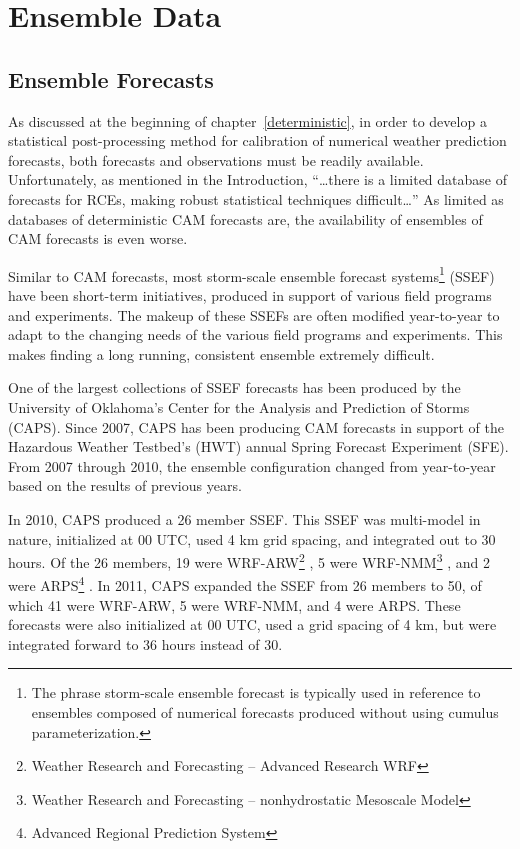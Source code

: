 

\section{Ensemble Data}
\label{edata}




\subsection{Ensemble Forecasts}
\label{emodel}

As discussed at the beginning of \mbox{chapter \ref{deterministic}}, in order to develop a statistical post-processing method for calibration of numerical weather prediction forecasts, both forecasts and observations must be readily available.
Unfortunately, as mentioned in the Introduction, ``\dots there is a limited database of forecasts for RCEs, making robust statistical techniques difficult\dots''
As limited as databases of deterministic CAM forecasts are, the availability of ensembles of CAM forecasts is even worse.


Similar to CAM forecasts, most storm-scale ensemble forecast systems\footnote{The phrase storm-scale ensemble forecast is typically used in reference to ensembles composed of numerical forecasts produced without using cumulus parameterization.} (SSEF) have been short-term initiatives, produced in support of various field programs and experiments.
The makeup of these SSEFs are often modified year-to-year to adapt to the changing needs of the various field programs and experiments.
This makes finding a long running, consistent ensemble extremely difficult.


One of the largest collections of SSEF forecasts has been produced by the University of Oklahoma's Center for the Analysis and Prediction of Storms (CAPS).
Since 2007, CAPS has been producing CAM forecasts in support of the Hazardous Weather Testbed's (HWT) annual Spring Forecast Experiment (SFE).
From 2007 through 2010, the ensemble configuration changed from year-to-year based on the results of previous years.


In 2010, CAPS produced a 26 member SSEF.
This SSEF was multi-model in nature, initialized at 00 UTC, used 4 km grid spacing, and integrated out to 30 hours.
Of the 26 members, 19 were WRF-ARW\footnote{Weather Research and Forecasting -- Advanced Research WRF} \citep{WRFV3}, 5 were WRF-NMM\footnote{Weather Research and Forecasting -- nonhydrostatic Mesoscale Model} \citep{NAMnWRF-NMM}, and 2 were ARPS\footnote{Advanced Regional Prediction System} \citep{ARPS}.
In 2011, CAPS expanded the SSEF from 26 members to 50, of which 41 were WRF-ARW, 5 were WRF-NMM, and 4 were ARPS.
These forecasts were also initialized at 00 UTC, used a grid spacing of 4 km, but were integrated forward to 36 hours instead of 30.


